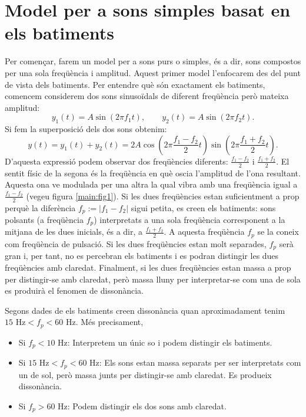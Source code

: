 \documentclass{article}
\theoremstyle{definition}
\newcommand{\0}{\ensuremath{\vb{0}}}
\begin{document}
\section{Model per a sons simples basat en els batiments}
Per començar, farem un model per a sons purs o simples, és a dir, sons compostos per una sola freqüència i amplitud. Aquest primer model l'enfocarem des del punt de vista dels batiments. Per entendre què són exactament els batiments, comencem considerem dos sons sinusoïdals de diferent freqüència però mateixa amplitud: $$y_1(t)=A\sin(2\pi f_1 t),\qquad y_2(t)=A\sin(2\pi f_2 t).$$
Si fem la superposició dels dos sons obtenim: $$y(t)=y_1(t)+y_2(t)=2A\cos\left(2\pi\frac{f_1-f_2}{2}t\right)\sin\left(2\pi\frac{f_1+f_2}{2}t\right).$$
D'aquesta expressió podem observar dos freqüències diferents: $\frac{f_1-f_2}{2}$ i $\frac{f_1+f_2}{2}$. El sentit físic de la segona és la freqüència en què osci\lgem a l'amplitud de l'ona resultant. Aquesta ona ve modulada per una altra la qual vibra amb una freqüència igual a $\frac{f_1-f_2}{2}$ (vegeu figura \ref{main:fig1}). Si les dues freqüències estan suficientment a prop perquè la diferència $f_p:=|f_1-f_2|$ sigui petita, es creen els batiments: sons polsants (a freqüència $f_p$) interpretats a una sola freqüència corresponent a la mitjana de les dues inicials, és a dir, a $\frac{f_1+f_2}{2}$. A aquesta freqüència $f_p$ se la coneix com freqüència de pulsació. Si les dues freqüències estan molt separades, $f_p$ serà gran i, per tant, no es percebran els batiments i es podran distingir les dues freqüències amb claredat. Finalment, si les dues freqüències estan massa a prop per distingir-se amb claredat, però massa lluny per interpretar-se com una de sola es produirà el fenomen de dissonància.
\begin{center}
    
    \label{main:fig1}
\end{center}
Segons dades de \cite{gibson} els batiments creen dissonància quan aproximadament tenim $15\text{ Hz}<f_p<60\text{ Hz}$. Més precisament,
\begin{itemize}
    \item Si $f_p<10\text{ Hz}$: Interpretem un únic so i podem distingir els batiments.
    \item Si $15\text{ Hz}<f_p<60\text{ Hz}$: Els sons estan massa separats per ser interpretats com un de sol, però massa junts per distingir-se amb claredat. Es produeix dissonància.
    \item Si $f_p>60\text{ Hz}$: Podem distingir els dos sons amb claredat.
\end{itemize}
\end{document}
